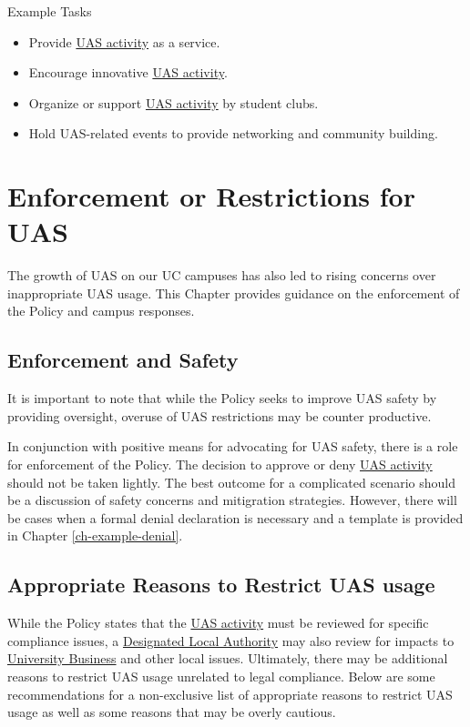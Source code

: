 \documentclass[
]{book}
\providecommand{\tightlist}{%
  \setlength{\itemsep}{0pt}\setlength{\parskip}{0pt}}
\begin{document}
Example Tasks

\begin{itemize}
\tightlist
\item
  Provide \protect\hyperlink{UASactivity}{UAS activity} as a service.
\item
  Encourage innovative \protect\hyperlink{UASactivity}{UAS activity}.
\item
  Organize or support \protect\hyperlink{UASactivity}{UAS activity} by student clubs.
\item
  Hold UAS-related events to provide networking and community building.
\end{itemize}

\hypertarget{ch-enforcement}{%
\chapter{Enforcement or Restrictions for UAS}\label{ch-enforcement}}

The growth of UAS on our UC campuses has also led to rising concerns over inappropriate UAS usage. This Chapter provides guidance on the enforcement of the Policy and campus responses.

\hypertarget{enforcement-and-safety}{%
\section{Enforcement and Safety}\label{enforcement-and-safety}}

It is important to note that while the Policy seeks to improve UAS safety by providing oversight, overuse of UAS restrictions may be counter productive.

In conjunction with positive means for advocating for UAS safety, there is a role for enforcement of the Policy. The decision to approve or deny \protect\hyperlink{UASactivity}{UAS activity} should not be taken lightly. The best outcome for a complicated scenario should be a discussion of safety concerns and mitigration strategies. However, there will be cases when a formal denial declaration is necessary and a template is provided in Chapter \ref{ch-example-denial}.

\hypertarget{appropriate-reasons-to-restrict-uas-usage}{%
\section{Appropriate Reasons to Restrict UAS usage}\label{appropriate-reasons-to-restrict-uas-usage}}

While the Policy states that the \protect\hyperlink{UASactivity}{UAS activity} must be reviewed for specific compliance issues, a \protect\hyperlink{DLA}{Designated Local Authority} may also review for impacts to \protect\hyperlink{UB}{University Business} and other local issues. Ultimately, there may be additional reasons to restrict UAS usage unrelated to legal compliance. Below are some recommendations for a non-exclusive list of appropriate reasons to restrict UAS usage as well as some reasons that may be overly cautious.
\end{document}
